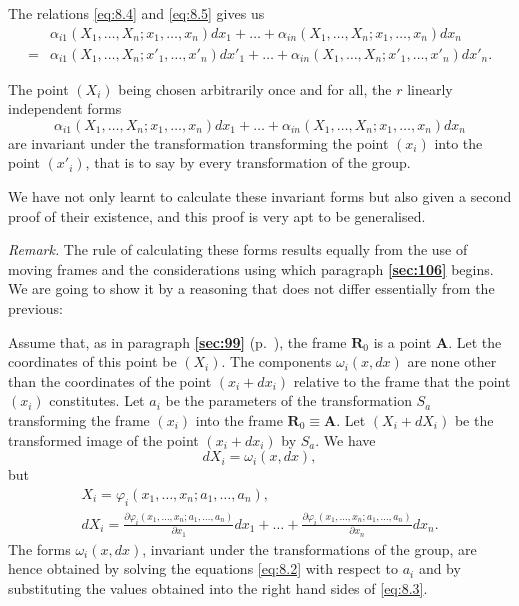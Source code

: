 \documentclass[leqno,11pt]{book}
\makeatletter
\numberwithin{equation}{chapter}
\newcommand{\pd}{\partial}
\theoremstyle{shape1}
\theoremstyle{shapesmall}
\let\old@phi\phi
\let\old@varphi\varphi
\let\phi\old@varphi
\let\varphi\old@phi
\newcommand{\fsref}[1]{{\rm\textsection\textbf{\ref{sec:#1}}}}
\newcommand{\somespace}{\vspace{9pt}}
\makeatother
\begin{document}
The relations \eqref{eq:8.4} and \eqref{eq:8.5} gives us
\begin{align*}
  &{}\alpha_{i1}(X_{1},\dots,X_{n};x_{1},\dots,x_{n})dx_{1}+\dots+\alpha_{in}(X_{1},\dots,X_{n};x_{1},\dots,x_{n})dx_{n}\\
  {}={}&{}\alpha_{i1}(X_{1},\dots,X_{n};x'_{1},\dots,x'_{n}) dx'_{1}+\dots+\alpha_{in}(X_{1},\dots,X_{n};x'_{1},\dots,x'_{n})dx'_{n}.
\end{align*}

The point $(X_{i})$ being chosen arbitrarily once and for all, the $r$ linearly independent forms
\[
\alpha_{i 1}(X_{1},\dots,X_{n};x_{1},\dots,x_{n})dx_{1}+\dots+\alpha_{in}(X_{1},\dots,X_{n};x_{1},\dots,x_{n})dx_{n}
\]
are invariant under the transformation transforming the point $(x_{i})$ into the point $(x'_{i})$, that is to say by every transformation of the group.

We have not only learnt to calculate these invariant forms but also given a second proof of their existence, and this proof is very apt to be generalised.

\somespace

\emph{Remark.} The rule of calculating these forms results equally from the use of moving frames and the considerations using which paragraph \fsref{106} begins. We are going to show it by a reasoning that does not differ essentially from the previous:

Assume that, as in paragraph \fsref{99} (p.~\pageref{sec:99}), the frame $\mathbf{R}_{0}$ is a point $\mathbf{A}$. Let the coordinates of this point be $(X_{i})$. The components $\omega_{i}(x,dx)$ are none other than the coordinates of the point $(x_{i}+dx_{i})$ relative to the frame that the point $(x_{i})$ constitutes. Let $a_{i}$ be the parameters of the transformation $S_{a}$ transforming the frame $(x_{i})$ into the frame $\mathbf{R}_{0}\equiv \mathbf{A}$. Let $(X_{i}+dX_{i})$ be the transformed image of the point $(x_{i}+dx_{i})$ by $S_{a}$. We have
\[
dX_{i}=\omega_{i}(x,dx),
\]
but
\begin{gather*}  
  X_{i}=\phi_{i}(x_{1},\dots,x_{n};a_{1},\dots,a_{n}),\\
  dX_{i}=\frac{\pd \phi_{i}(x_{1},\dots,x_{n};a_{1},\dots,a_{n})}{\pd x_{1}}dx_{1}+\dots+\frac{\pd \phi_{i}(x_{1},\dots,x_{n};a_{1},\dots,a_{n})}{\pd x_{n}}dx_{n}.
\end{gather*}
The forms $\omega_{i}(x,dx)$, invariant under the transformations of the group, are hence obtained by solving the equations \eqref{eq:8.2} with respect to $a_{i}$ and by substituting the values obtained into the right hand sides of \eqref{eq:8.3}.
\end{document}

